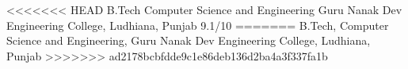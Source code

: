 <<<<<<< HEAD
    {B.Tech}
    {Computer Science and Engineering}
    {Guru Nanak Dev Engineering College, Ludhiana, Punjab}
    {9.1/10}
    {}
=======
    {B.Tech, }
    {Computer Science and Engineering, }
    {Guru Nanak Dev Engineering College, Ludhiana, Punjab}
    {}
    {}
>>>>>>> ad2178bcbfdde9c1e86deb136d2ba4a3f337fa1b


